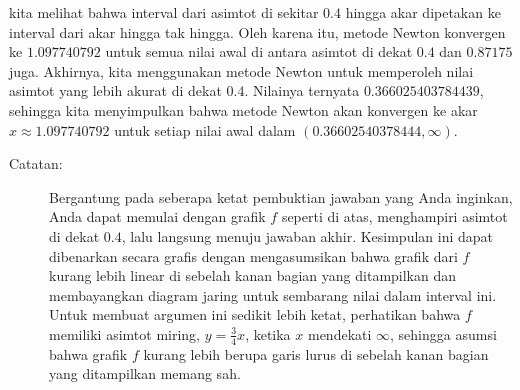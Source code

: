 \begin{description}
\noindent kita melihat bahwa interval dari asimtot di sekitar $0.4$
hingga akar dipetakan ke interval dari akar hingga tak hingga. Oleh
karena itu, metode Newton konvergen ke $1.097740792$ untuk semua
nilai awal di antara asimtot di dekat $0.4$ dan $0.87175$ juga.
Akhirnya, kita menggunakan metode Newton untuk memperoleh nilai asimtot
yang lebih akurat di dekat $0.4$. Nilainya ternyata $0.366025403784439$,
sehingga kita menyimpulkan bahwa metode Newton akan konvergen ke akar
$\hat{x}\approx1.097740792$ untuk setiap nilai awal dalam $(0.36602540378444,\infty)$.
\begin{description}
\item [{Catatan:}] Bergantung pada seberapa ketat pembuktian jawaban yang
Anda inginkan, Anda dapat memulai dengan grafik $f$ seperti di atas,
menghampiri asimtot di dekat $0.4$, lalu langsung menuju jawaban
akhir. Kesimpulan ini dapat dibenarkan secara grafis dengan mengasumsikan
bahwa grafik dari $f$ kurang lebih linear di sebelah kanan bagian
yang ditampilkan dan membayangkan diagram jaring untuk sembarang nilai
dalam interval ini. Untuk membuat argumen ini sedikit lebih ketat,
perhatikan bahwa $f$ memiliki asimtot miring, $y=\frac{3}{4}x$,
ketika $x$ mendekati $\infty$, sehingga asumsi bahwa grafik $f$
kurang lebih berupa garis lurus di sebelah kanan bagian yang ditampilkan
memang sah.
\end{description}
\item [{\ref{exc:newton-8}:}]~


\end{description}
